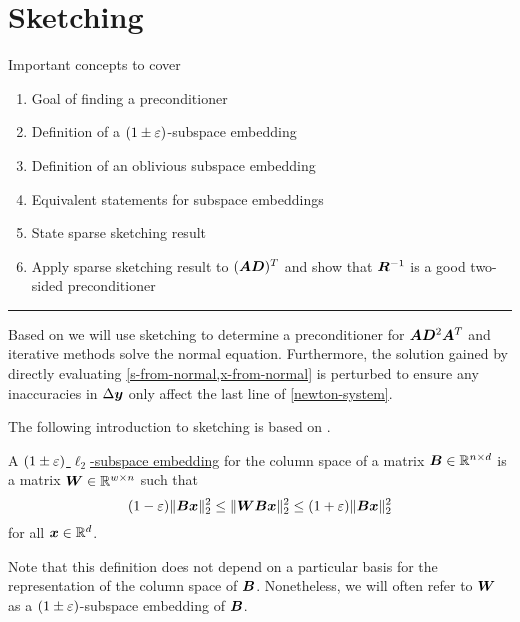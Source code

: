 \chapter{Sketching}

Important concepts to cover
\begin{enumerate}
  \item Goal of finding a preconditioner
  \item Definition of a \((1\pm\varepsilon)\)-subspace embedding
  \item Definition of an oblivious subspace embedding
  \item Equivalent statements for subspace embeddings
  \item State sparse sketching result
  \item Apply sparse sketching result to \((\bm{A}\bm{D})^T\) and show that \(\bm{R}^{-1}\) is a good two-sided preconditioner
\end{enumerate}

\hrule

Based on \cite{Avron-FasterRandomizedInfeasibleIPMs} we will use sketching to determine a preconditioner for \(\bm{A} \bm{D}^2 \bm{A}^T\) and iterative methods solve the normal equation. Furthermore, the solution gained by directly evaluating \cref{s-from-normal,x-from-normal} is perturbed to ensure any inaccuracies in \(\Delta\bm{y}\) only affect the last line of \cref{newton-system}.

The following introduction to sketching is based on \cite{Woodruff-Sketching}.

\begin{definition} \label{def:subspace-embedding}
A \uline{\((1 \pm \varepsilon)\) \(\ell_2\)-subspace embedding} for the column space of a matrix \(\bm{B} \in \mathbb{R}^{n \times d}\) is a matrix \(\bm{W} \in \mathbb{R}^{w \times n}\) such that
\[ (1-\varepsilon) \lVert \bm{B}\bm{x} \rVert_2^2 \leq \lVert \bm{W}\bm{B}\bm{x} \rVert_2^2 \leq (1+\varepsilon)\lVert \bm{B}\bm{x} \rVert_2^2 \]
for all \(\bm{x} \in \mathbb{R}^d\).
\end{definition}
Note that this definition does not depend on a particular basis for the representation of the column space of \(\bm{B}\).
Nonetheless, we will often refer to \(\bm{W}\) as a \((1\pm\varepsilon)\)-subspace embedding of \(\bm{B}\).

